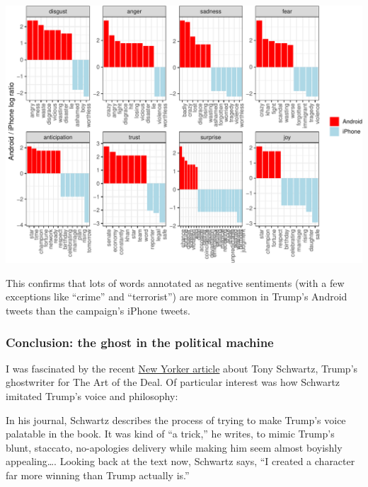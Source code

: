 \documentclass[
]{jss}
\begin{document}
\begin{CodeChunk}


\begin{center}\includegraphics{Live_Demo2_files/figure-latex/unnamed-chunk-8-1} \end{center}

\end{CodeChunk}

This confirms that lots of words annotated as negative sentiments (with
a few exceptions like ``crime'' and ``terrorist'') are more common in
Trump's Android tweets than the campaign's iPhone tweets.

\hypertarget{conclusion-the-ghost-in-the-political-machine}{%
\subsubsection{Conclusion: the ghost in the political
machine}\label{conclusion-the-ghost-in-the-political-machine}}

I was fascinated by the recent
\href{http://www.newyorker.com/magazine/2016/07/25/donald-trumps-ghostwriter-tells-all}{New
Yorker article} about Tony Schwartz, Trump's ghostwriter for The Art of
the Deal. Of particular interest was how Schwartz imitated Trump's voice
and philosophy:

In his journal, Schwartz describes the process of trying to make Trump's
voice palatable in the book. It was kind of ``a trick,'' he writes, to
mimic Trump's blunt, staccato, no-apologies delivery while making him
seem almost boyishly appealing\ldots. Looking back at the text now,
Schwartz says, ``I created a character far more winning than Trump
actually is.''
\end{document}
